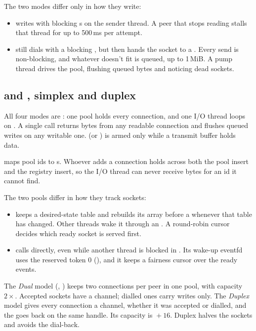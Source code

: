 The two modes differ only in how they write:
\begin{itemize}
  \item {} writes with blocking s on the sender thread. A peer
        that stops reading stalls that thread for up to 500\,ms per attempt.
  \item {} still dials with a blocking , but then hands
        the socket to a . Every send is non-blocking, and
        whatever doesn't fit is queued, up to 1\,MiB. A pump thread drives the pool,
        flushing queued bytes and noticing dead sockets.
\end{itemize}

\subsection{ and , simplex and duplex}

All four modes are : one pool holds every connection, and
one I/O thread loops on . A single call returns bytes from any
readable connection and flushes queued writes on any writable one. 
(or ) is armed only while a transmit buffer holds data.

 maps pool ids to s. Whoever adds a connection
holds  across both the pool insert and the registry insert, so
the I/O thread can never receive bytes for an id it cannot find.

The two pools differ in how they track sockets:
\begin{itemize}
  \item {} keeps a desired-state table and rebuilds its
         array before a  whenever that table has
        changed. Other threads wake it through
        an . A round-robin cursor decides which ready socket is
        served first.
  \item {} calls  directly, even while
        another thread is blocked in . Its wake-up eventfd uses the
        reserved token 0 (), and it keeps a fairness cursor over the
        ready events.
\end{itemize}

The \emph{Dual} model (, ) keeps two connections per peer in
one pool, with capacity $2\times$. Accepted sockets have a channel;
dialled ones carry writes only. The \emph{Duplex} model gives every connection a
channel, whether it was accepted or dialled, and the  goes back on
the same handle. Its capacity is ${}+16$. Duplex halves the sockets
and avoids the dial-back.

